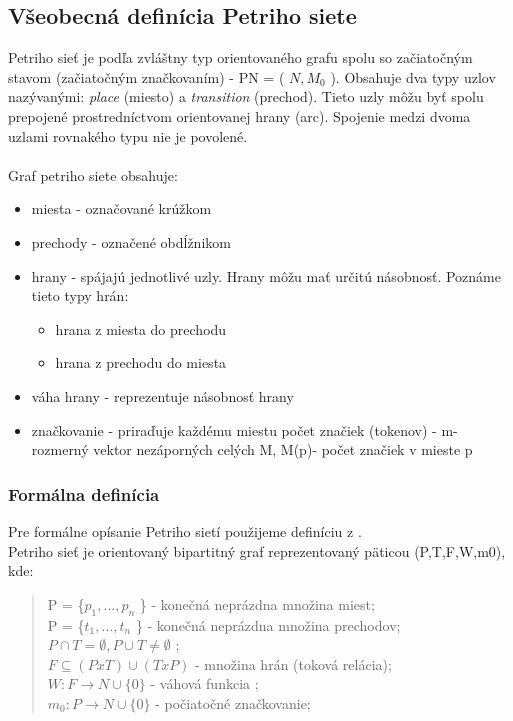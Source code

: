 \subsection{Všeobecná definícia Petriho siete}
Petriho sieť je podľa 
 zvláštny typ orientovaného grafu spolu so začiatočným stavom (začiatočným značkovaním) - PN = ( $N, M_{0}$ ). 
Obsahuje dva typy uzlov nazývanými: \emph{place}  (miesto) a \emph{transition} (prechod). Tieto uzly môžu byť spolu prepojené prostredníctvom orientovanej hrany (arc). Spojenie medzi dvoma uzlami rovnakého typu nie je povolené.
\\
\\
Graf petriho siete obsahuje: 
\begin{itemize}
	\item miesta - označované krúžkom 
	\item prechody - označené obdĺžnikom
	\item hrany - spájajú jednotlivé uzly. Hrany môžu mať určitú násobnosť. Poznáme tieto typy hrán: 
		\begin{itemize}
			\item hrana z miesta do prechodu
			\item hrana z prechodu do miesta
		\end{itemize}
	\item váha hrany - reprezentuje násobnosť hrany
	\item značkovanie - priraďuje každému miestu počet značiek (tokenov) - m-rozmerný vektor nezáporných celých M, M(p)- počet značiek v mieste p 
\end{itemize}

\subsubsection*{Formálna definícia}
Pre formálne opísanie Petriho sietí použijeme definíciu z 
.\\
	Petriho sieť je orientovaný bipartitný graf reprezentovaný päticou (P,T,F,W,m0), kde:\\
\begin{quotation}
	\noindent P = \{$ p_{1}, ... ,p_{n}$ \} - konečná neprázdna množina miest;\\
	P = \{$ t_{1}, ... ,t_{n}$ \} - konečná neprázdna množina prechodov;\\
	{$ P \cap T = \emptyset,P \cup T \neq \emptyset $ }; \\
	{$ F\subseteq ( P x T ) \cup (T x P)$}  - množina hrán (toková relácia);\\
	{$ W : F \rightarrow N \cup \{ 0\}$} - váhová funkcia ;\\
	{$ m_{0} : P \rightarrow N \cup \{ 0\}$} - počiatočné značkovanie;\\
\end{quotation}

